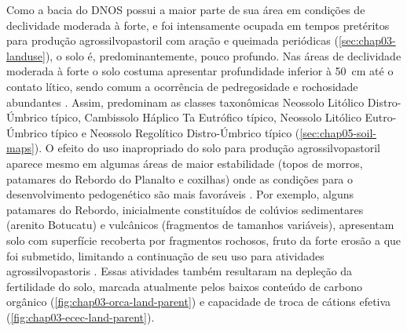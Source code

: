 Como a bacia do DNOS possui a maior parte de sua área em condições de declividade moderada à forte, e foi 
intensamente ocupada em tempos pretéritos para produção agrossilvopastoril com aração e queimada periódicas 
(\autoref{sec:chap03-landuse}), o solo é, predominantemente, pouco profundo. Nas áreas de declividade moderada 
à forte o solo costuma apresentar profundidade inferior à \SI{50}{\cm} até o contato lítico, sendo comum a 
ocorrência de pedregosidade e rochosidade abundantes \cite{Miguel2010}. Assim, predominam as classes 
taxonômicas Neossolo Litólico Distro-Úmbrico típico, Cambissolo Háplico Ta Eutrófico típico, Neossolo Litólico 
Eutro-Úmbrico típico e Neossolo Regolítico Distro-Úmbrico típico (\autoref{sec:chap05-soil-maps}). O efeito do 
uso inapropriado do solo para produção agrossilvopastoril aparece mesmo em algumas áreas de maior estabilidade
(topos de morros, patamares do Rebordo do Planalto e coxilhas) onde as condições para o desenvolvimento 
pedogenético são mais favoráveis \cite{Moser1990, MouraBueno2012}. Por exemplo, alguns patamares do Rebordo, 
inicialmente constituídos de colúvios sedimentares (arenito Botucatu) e vulcânicos (fragmentos de tamanhos 
variáveis), apresentam solo com superfície recoberta por fragmentos rochosos, fruto da forte erosão a que foi 
submetido, limitando a continuação de seu uso para atividades agrossilvopastoris \cite{MouraBueno2012}. Essas 
atividades também resultaram na depleção da fertilidade do solo, marcada atualmente pelos baixos conteúdo de 
carbono orgânico (\autoref{fig:chap03-orca-land-parent}) e capacidade de troca de cátions efetiva 
(\autoref{fig:chap03-ecec-land-parent}).

